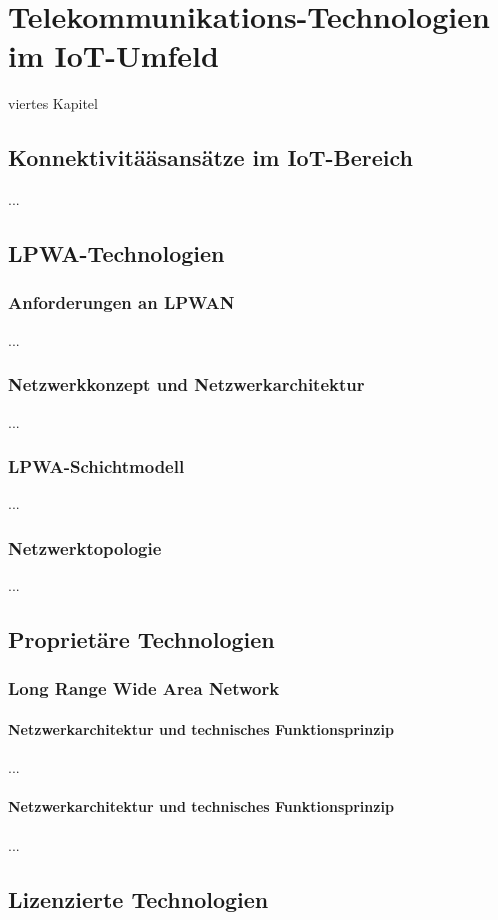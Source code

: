 \chapter{Telekommunikations-Technologien im IoT-Umfeld}
viertes Kapitel

\section{Konnektivitä{\"a}sans{\"a}tze im IoT-Bereich}
...


\section{LPWA-Technologien}
\subsection{Anforderungen an LPWAN}
...
\subsection{Netzwerkkonzept und Netzwerkarchitektur}
...

\subsection{LPWA-Schichtmodell}
...

\subsection{Netzwerktopologie}
...

\section{Proprietäre Technologien}
\subsection{Long Range Wide Area Network}
\subsubsection{Netzwerkarchitektur und technisches Funktionsprinzip}
...

\subsubsection{Netzwerkarchitektur und technisches Funktionsprinzip}
...


\section{Lizenzierte Technologien}
